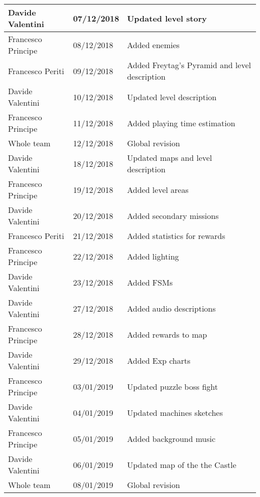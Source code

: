 \begin{longtable}[H]{|l|l|l|}
Davide Valentini & 07/12/2018 & Updated level story \\ \hline
Francesco Principe & 08/12/2018 & Added enemies \\ \hline
Francesco Periti & 09/12/2018 & Added Freytag's Pyramid and level description \\ \hline
Davide Valentini & 10/12/2018 & Updated level description \\ \hline
Francesco Principe & 11/12/2018 & Added playing time estimation \\ \hline
Whole team & 12/12/2018 & Global revision \\ \hline

Davide Valentini & 18/12/2018 & Updated maps and level description \\ \hline
Francesco Principe & 19/12/2018 & Added level areas \\ \hline
Davide Valentini & 20/12/2018 & Added secondary missions \\ \hline
Francesco Periti & 21/12/2018 & Added statistics for rewards \\ \hline
Francesco Principe & 22/12/2018 & Added lighting \\ \hline
Davide Valentini & 23/12/2018 & Added FSMs \\ \hline
Davide Valentini & 27/12/2018 & Added audio descriptions \\ \hline
Francesco Principe & 28/12/2018 & Added rewards to map \\ \hline
Davide Valentini & 29/12/2018 & Added Exp charts \\ \hline
Francesco Principe & 03/01/2019 & Updated puzzle boss fight \\ \hline
Davide Valentini & 04/01/2019 & Updated machines sketches \\ \hline
Francesco Principe & 05/01/2019 & Added background music \\ \hline
Davide Valentini & 06/01/2019 & Updated map of the the Castle \\ \hline
Whole team & 08/01/2019 & Global revision \\ \hline
\end{longtable}
